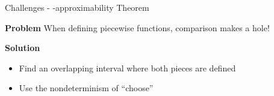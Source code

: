 \begin{frame}{Challenges - \WhileCC-approximability Theorem}
    \begin{minipage}[t]{0.4\linewidth}
        \vspace{-2em}
        \begin{exampleblock}{\color{BrickRed}\textbf{Problem}}
            When defining piecewise functions, comparison makes a hole! 
        \end{exampleblock}
        \pause
        \vspace{0.75em}
         \begin{exampleblock}{\textbf{Solution}}
            \begin{itemize}
                \pause \item Find an overlapping interval where both pieces are defined
                \pause \item Use the nondeterminism of ``choose''  
            \end{itemize}
            \pause
                       
        \end{exampleblock}     


\end{minipage}
\end{frame}
